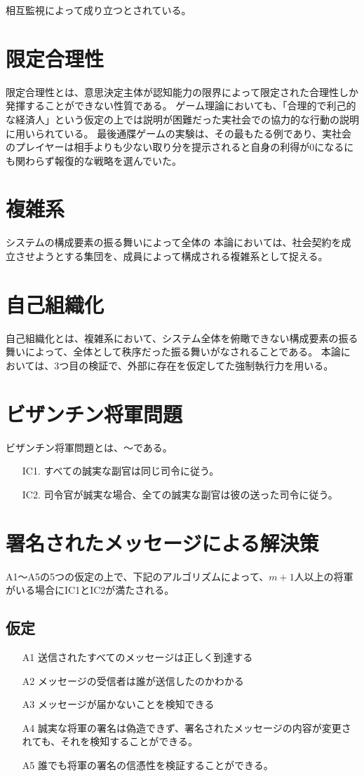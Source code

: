 相互監視によって成り立つとされている。


\section{限定合理性}
限定合理性とは、意思決定主体が認知能力の限界によって限定された合理性しか発揮することができない性質である。
ゲーム理論においても、「合理的で利己的な経済人」という仮定の上では説明が困難だった実社会での協力的な行動の説明に用いられている。
最後通牒ゲームの実験は、その最もたる例であり、実社会のプレイヤーは相手よりも少ない取り分を提示されると自身の利得が0になるにも関わらず報復的な戦略を選んでいた。\cite{GUTH1982367}

\section{複雑系}
システムの構成要素の振る舞いによって全体の
本論においては、社会契約を成立させようとする集団を、成員によって構成される複雑系として捉える。

\section{自己組織化}
自己組織化とは、複雑系において、システム全体を俯瞰できない構成要素の振る舞いによって、全体として秩序だった振る舞いがなされることである。
本論においては、3つ目の検証で、外部に存在を仮定してた強制執行力を用いる。

\section{ビザンチン将軍問題}
ビザンチン将軍問題とは、〜である。

\begin{itemize}
  \item[IC1.] すべての誠実な副官は同じ司令に従う。
  \item[IC2.] 司令官が誠実な場合、全ての誠実な副官は彼の送った司令に従う。
\end{itemize}

\section{署名されたメッセージによる解決策}
A1〜A5の5つの仮定の上で、下記のアルゴリズムによって、$m+1$人以上の将軍がいる場合にIC1とIC2が満たされる。

\subsection{仮定}
\begin{itemize}
  \item[A1] 送信されたすべてのメッセージは正しく到達する
  \item[A2] メッセージの受信者は誰が送信したのかわかる
  \item[A3] メッセージが届かないことを検知できる
  \item[A4] 誠実な将軍の署名は偽造できず、署名されたメッセージの内容が変更されても、それを検知することができる。
  \item[A5] 誰でも将軍の署名の信憑性を検証することができる。
\end{itemize}

